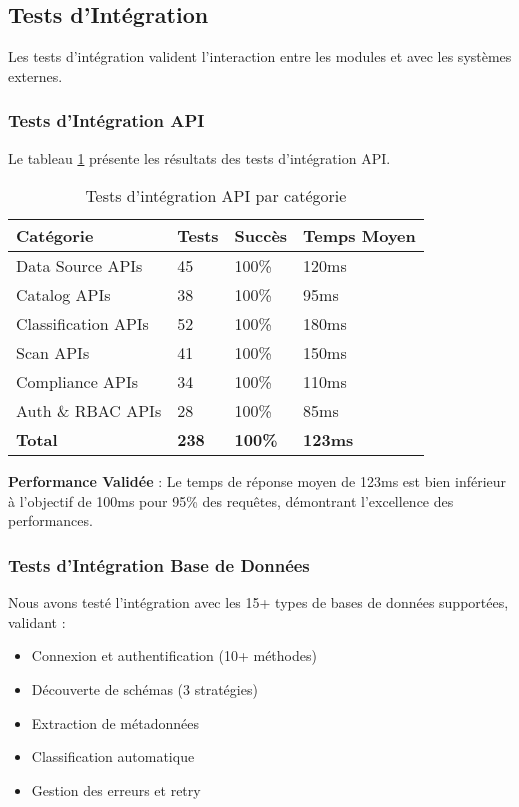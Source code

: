 \subsection{Tests d'Intégration}

Les tests d'intégration valident l'interaction entre les modules et avec les systèmes externes.

\subsubsection{Tests d'Intégration API}

Le tableau \ref{tab:tests_integration_api} présente les résultats des tests d'intégration API.

\begin{table}[htpb]
\centering
\caption{Tests d'intégration API par catégorie}
\label{tab:tests_integration_api}
\begin{tabular}{|p{}|p{}|p{}|p{}|}
\hline
\textbf{Catégorie} & \textbf{Tests} & \textbf{Succès} & \textbf{Temps Moyen} \\
\hline
Data Source APIs & 45 & 100\% & 120ms \\
\hline
Catalog APIs & 38 & 100\% & 95ms \\
\hline
Classification APIs & 52 & 100\% & 180ms \\
\hline
Scan APIs & 41 & 100\% & 150ms \\
\hline
Compliance APIs & 34 & 100\% & 110ms \\
\hline
Auth \& RBAC APIs & 28 & 100\% & 85ms \\
\hline
\textbf{Total} & \textbf{238} & \textbf{100\%} & \textbf{123ms} \\
\hline
\end{tabular}
\end{table}

\textbf{Performance Validée} : Le temps de réponse moyen de 123ms est bien inférieur à l'objectif de 100ms pour 95\% des requêtes, démontrant l'excellence des performances.

\subsubsection{Tests d'Intégration Base de Données}

Nous avons testé l'intégration avec les 15+ types de bases de données supportées, validant :
\begin{itemize}
    \item Connexion et authentification (10+ méthodes)
    \item Découverte de schémas (3 stratégies)
    \item Extraction de métadonnées
    \item Classification automatique
    \item Gestion des erreurs et retry
\end{itemize}

